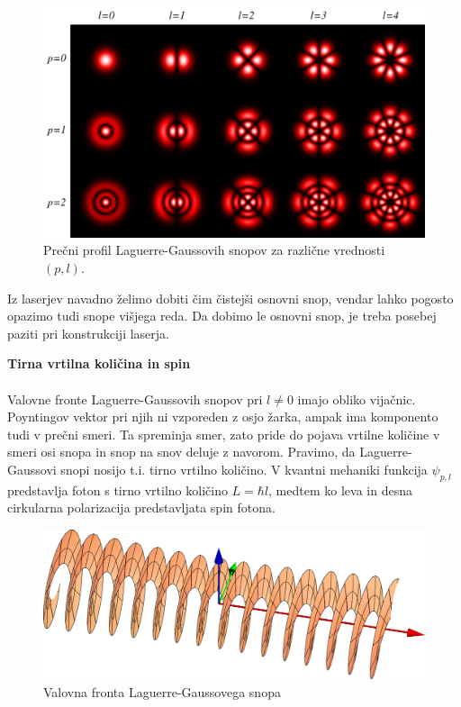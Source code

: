 \begin{figure}[h]
\centering
\includegraphics[width=11truecm]{slike/03_Laguerre_Gauss.png}
\caption{Prečni profil Laguerre-Gaussovih snopov za različne vrednosti $(p,l)$.}
\label{fig:Laguerrovi_presek}
\end{figure}


Iz laserjev navadno želimo dobiti čim čistejši osnovni snop, vendar
lahko pogosto opazimo tudi snope višjega reda. Da dobimo le osnovni
snop, je treba posebej paziti pri konstrukciji laserja.

\begin{remark}{{\bf Tirna vrtilna količina in spin}}\\ \\
Valovne fronte Laguerre-Gaussovih snopov pri $l\ne0$ imajo obliko vijačnic. Poyntingov 
vektor pri njih ni vzporeden z osjo žarka, ampak ima komponento tudi v prečni smeri. Ta spreminja smer, 
zato pride do pojava vrtilne količine v smeri osi snopa in snop na snov deluje z navorom. 
Pravimo, da Laguerre-Gaussovi snopi nosijo t.i. tirno vrtilno količino. 
V kvantni mehaniki funkcija $\psi_{p,l}$ predstavlja foton s tirno vrtilno količino $L = \hbar l$, 
medtem ko leva in desna cirkularna polarizacija predstavljata spin fotona. 
\begin{figure}[h]
\centering
\includegraphics[width=10truecm]{slike/03_laguerre_faza.png}
\caption{Valovna fronta Laguerre-Gaussovega snopa}
\label{fig:Laguerrova_fronta}
\end{figure}
\end{remark}

